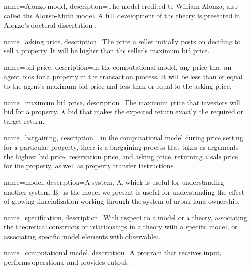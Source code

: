 {
name=Alonzo model,
description={The model credited to William Alonzo, also called the Alonso-Muth model. A full development of the theory is presented in Alonzo's doctoral dissertation \cite{alonzoTheoryUrbanLand1960}.} %
}

{
name=asking price,
description={The price a seller initially posts on deciding to sell a property. It will be higher than the seller's maximum bid price.}
}

{
name=bid price,
description={In the computational model, any price that an agent bids for a property in the transaction process. It will be less than or equal to the agent's maximum bid price and less than or equal to the asking price.}
}

{
name=maximum bid price,
description={The maximum price that investors will bid for a property. A bid that makes the expected return exactly the required or  target return.}
}

{
name=bargaining,
description= {in the computational model during price setting for a particular property, there is a bargaining process that takes as arguments the highest bid price, reservation price, and asking price, returning a sale price for the property, as well as property transfer instructions.}
}


{
name=model,
description={A system, A, which is useful for understanding another system, B. as the model we present is useful for understanding the effect of growing finacialization working through the system of urban land ownership.}
}

{
name=specification,
description={With respect to a model or a theory, associating the theoretical constructs or relationships in a theory with a specific model, or associating specific model elements with observables.}
}

{
name=computational model,
description={A program that receives input, performs operations, and provides output.}
}

